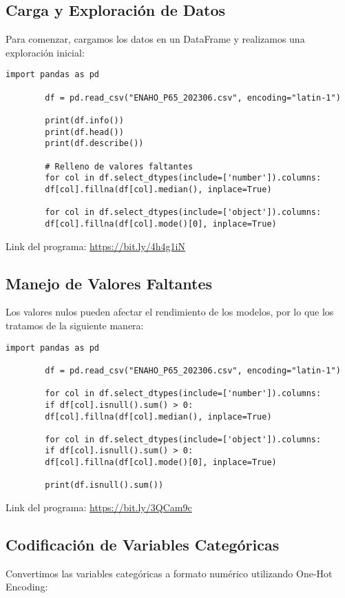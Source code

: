 \documentclass{book}
\begin{document}
	\subsection{Carga y Exploraci\'on de Datos}
	Para comenzar, cargamos los datos en un DataFrame y realizamos una exploraci\'on inicial:
	
	\begin{lstlisting}[caption=Carga y Exploraci\'on de Datos]
		import pandas as pd
		
		df = pd.read_csv("ENAHO_P65_202306.csv", encoding="latin-1")
		
		print(df.info())
		print(df.head())
		print(df.describe())
		
		# Relleno de valores faltantes
		for col in df.select_dtypes(include=['number']).columns:
		df[col].fillna(df[col].median(), inplace=True)
		
		for col in df.select_dtypes(include=['object']).columns:
		df[col].fillna(df[col].mode()[0], inplace=True)
	\end{lstlisting}
	Link del programa: \href{https://bit.ly/4h4g1iN}{https://bit.ly/4h4g1iN}
	
	\subsection{Manejo de Valores Faltantes}
	Los valores nulos pueden afectar el rendimiento de los modelos, por lo que los tratamos de la siguiente manera:
	
	\begin{lstlisting}[caption=Manejo de Valores Faltantes]
		import pandas as pd
		
		df = pd.read_csv("ENAHO_P65_202306.csv", encoding="latin-1")
		
		for col in df.select_dtypes(include=['number']).columns:
		if df[col].isnull().sum() > 0:
		df[col].fillna(df[col].median(), inplace=True)
		
		for col in df.select_dtypes(include=['object']).columns:
		if df[col].isnull().sum() > 0:
		df[col].fillna(df[col].mode()[0], inplace=True)
		
		print(df.isnull().sum())
	\end{lstlisting}
	Link del programa: \href{https://bit.ly/3QCam9c}{https://bit.ly/3QCam9c}
	
	\subsection{Codificaci\'on de Variables Categ\'oricas}
	Convertimos las variables categ\'oricas a formato num\'erico utilizando One-Hot Encoding:
	
\end{document}

